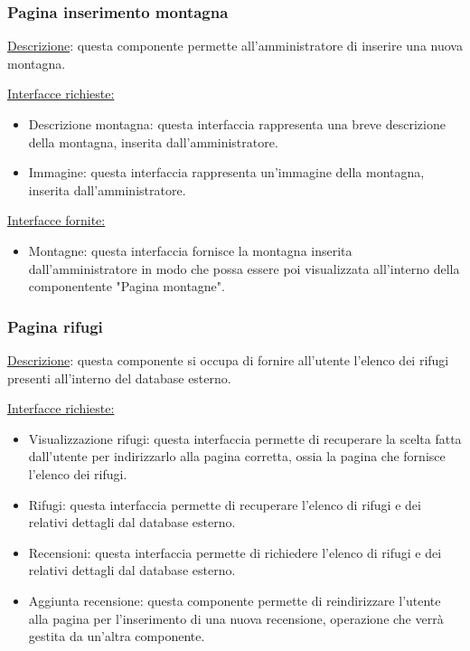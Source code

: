 \documentclass[a4paper,12pt]{article}
\begin{document}
\subsubsection{Pagina inserimento montagna}
\underline{Descrizione}: questa componente permette all'amministratore di inserire una nuova montagna.

\underline{Interfacce richieste:}
\begin{itemize}
\item Descrizione montagna: questa interfaccia rappresenta una breve descrizione della montagna, inserita dall'amministratore.
\item Immagine: questa interfaccia rappresenta un'immagine della montagna, inserita dall'amministratore.
\end{itemize}

\underline{Interfacce fornite:}
\begin{itemize}
\item Montagne: questa interfaccia fornisce la montagna inserita dall'amministratore in modo che possa essere poi visualizzata all'interno della componentente "Pagina montagne".
\end{itemize}



\subsubsection{Pagina rifugi}
\underline{Descrizione}: questa componente si occupa di fornire all'utente l'elenco dei rifugi presenti all'interno del database esterno.

\underline{Interfacce richieste:}
\begin{itemize}
\item Visualizzazione rifugi: questa interfaccia permette di recuperare la scelta fatta dall'utente per indirizzarlo alla pagina corretta, ossia la pagina che fornisce l'elenco dei rifugi.
\item Rifugi: questa interfaccia permette di recuperare l'elenco di rifugi e dei relativi dettagli dal database esterno.
\item Recensioni: questa interfaccia permette di richiedere l'elenco di rifugi e dei relativi dettagli dal database esterno.
\item Aggiunta recensione: questa componente permette di reindirizzare l'utente alla pagina per l'inserimento di una nuova recensione, operazione che verrà gestita da un'altra componente.
\end{itemize}
\end{document}
